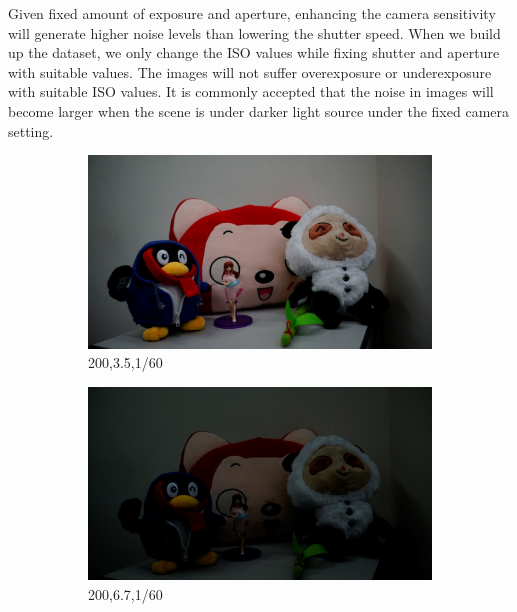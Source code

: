 Given fixed amount of exposure and aperture, enhancing the camera sensitivity will generate higher noise levels than lowering the shutter speed. When we build up the dataset, we only change the ISO values while fixing shutter and aperture with suitable values. The images will not suffer overexposure or underexposure with suitable ISO values. It is commonly accepted that the noise in images will become larger when the scene is under darker light source under the fixed camera setting.


\begin{figure}
    \centering
    \begin{subfigure}[t]{0.32\textwidth}
        \centering
        \includegraphics[width=1\textwidth]{images/dataset/200_3-5_1-60.jpg}
	   \caption{200,3.5,1/60}
    \end{subfigure}
    \hfill
    \begin{subfigure}[t]{0.32\textwidth}
        \centering
        \includegraphics[width=1\textwidth]{images/dataset/200_6-7_1-60.jpg}
		\caption{200,6.7,1/60}
    \end{subfigure}
    \hfill
    \begin{subfigure}[t]{0.32\textwidth}

\end{subfigure}
\end{figure}
